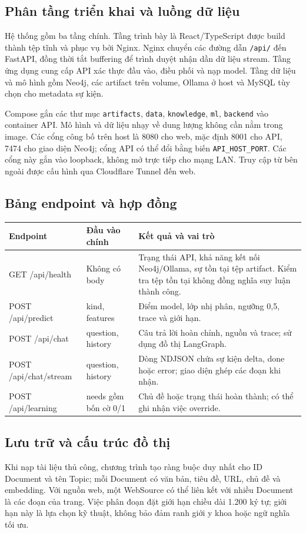 \subsection{Phân tầng triển khai và luồng dữ liệu}
Hệ thống gồm ba tầng chính. Tầng trình bày là React/TypeScript được build thành tệp tĩnh và phục vụ bởi Nginx. Nginx chuyển các đường dẫn \texttt{/api/} đến FastAPI, đồng thời tắt buffering để trình duyệt nhận dần dữ liệu stream. Tầng ứng dụng cung cấp API xác thực đầu vào, điều phối và nạp model. Tầng dữ liệu và mô hình gồm Neo4j, các artifact trên volume, Ollama ở host và MySQL tùy chọn cho metadata sự kiện.

Compose gắn các thư mục \texttt{artifacts}, \texttt{data}, \texttt{knowledge}, \texttt{ml}, \texttt{backend} vào container API. Mô hình và dữ liệu nhạy về dung lượng không cần nằm trong image. Các cổng công bố trên host là 8080 cho web, mặc định 8001 cho API, 7474 cho giao diện Neo4j; cổng API có thể đổi bằng biến \texttt{API\_HOST\_PORT}. Các cổng này gắn vào loopback, không mở trực tiếp cho mạng LAN. Truy cập từ bên ngoài được cấu hình qua Cloudflare Tunnel đến web.
\subsection{Bảng endpoint và hợp đồng}
\begin{longtable}{p{3.2cm}p{4.4cm}p{6.3cm}}\toprule
\textbf{Endpoint} & \textbf{Đầu vào chính} & \textbf{Kết quả và vai trò}\\\midrule\endhead
GET /api/health & Không có body & Trạng thái API, khả năng kết nối Neo4j/Ollama, sự tồn tại tệp artifact. Kiểm tra tệp tồn tại không đồng nghĩa suy luận thành công.\\
POST /api/predict & kind, features & Điểm model, lớp nhị phân, ngưỡng 0,5, trace và giới hạn.\\
POST /api/chat & question, history & Câu trả lời hoàn chỉnh, nguồn và trace; sử dụng đồ thị LangGraph.\\
POST /api/chat/stream & question, history & Dòng NDJSON chứa sự kiện delta, done hoặc error; giao diện ghép các đoạn khi nhận.\\
POST /api/learning & needs gồm bốn cờ 0/1 & Chủ đề hoặc trạng thái hoàn thành; có thể ghi nhận việc override.\\\bottomrule\end{longtable}
\subsection{Lưu trữ và cấu trúc đồ thị}
Khi nạp tài liệu thủ công, chương trình tạo ràng buộc duy nhất cho ID Document và tên Topic; mỗi Document có văn bản, tiêu đề, URL, chủ đề và embedding. Với nguồn web, một WebSource có thể liên kết với nhiều Document là các đoạn của trang. Việc phân đoạn đặt giới hạn chiều dài 1.200 ký tự; giới hạn này là lựa chọn kỹ thuật, không bảo đảm ranh giới y khoa hoặc ngữ nghĩa tối ưu.

